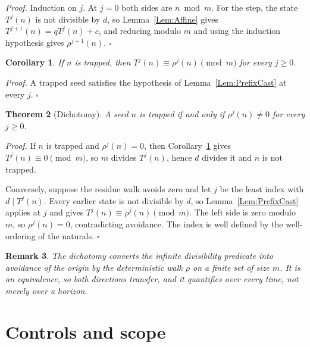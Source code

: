 \documentclass[11pt,letterpaper]{article}
\newtheorem{theorem}{Theorem}
\newtheorem{corollary}[theorem]{Corollary}
\newtheorem{remark}[theorem]{Remark}
\newenvironment{proof}{\noindent\textit{Proof.}}{\hfill\(\square\)}
\begin{document}
\begin{proof}
Induction on \(j\). At \(j=0\) both sides are \(n\bmod m\). For the step, the
state \(T^{j}(n)\) is not divisible by \(d\), so Lemma~\ref{Lem:Affine} gives
\(T^{j+1}(n)=qT^{j}(n)+c\), and reducing modulo \(m\) and using the induction
hypothesis gives \(\rho^{j+1}(n)\).
\end{proof}

\begin{corollary}\label{Cor:Cast}
If \(n\) is trapped, then \(T^{j}(n)\equiv\rho^{j}(n)\pmod m\) for every
\(j\ge0\).
\end{corollary}

\begin{proof}
A trapped seed satisfies the hypothesis of Lemma~\ref{Lem:PrefixCast} at every
\(j\).
\end{proof}

\begin{theorem}[Dichotomy]\label{Thm:Dichotomy}
A seed \(n\) is trapped if and only if \(\rho^{j}(n)\ne0\) for every \(j\ge0\).
\end{theorem}

\begin{proof}
If \(n\) is trapped and \(\rho^{j}(n)=0\), then Corollary~\ref{Cor:Cast} gives
\(T^{j}(n)\equiv0\pmod m\), so \(m\) divides \(T^{j}(n)\), hence \(d\) divides
it and \(n\) is not trapped.

Conversely, suppose the residue walk avoids zero and let \(j\) be the least
index with \(d\mid T^{j}(n)\). Every earlier state is not divisible by \(d\), so
Lemma~\ref{Lem:PrefixCast} applies at \(j\) and gives
\(T^{j}(n)\equiv\rho^{j}(n)\pmod m\). The left side is zero modulo \(m\), so
\(\rho^{j}(n)=0\), contradicting avoidance. The index is well defined by the
well-ordering of the naturals.
\end{proof}

\begin{remark}\label{Rem:ResidueMeaning}
The dichotomy converts the infinite divisibility predicate into avoidance of
the origin by the deterministic walk \(\rho\) on a finite set of size \(m\).
It is an equivalence, so both directions transfer, and it quantifies over
every time, not merely over a horizon.
\end{remark}

\section{Controls and scope}
\end{document}
